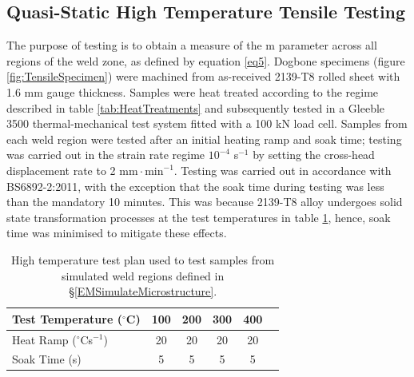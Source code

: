 	\subsection{Quasi-Static High Temperature Tensile Testing}
	\label{EMTensileHT}
	The purpose of testing is to obtain a measure of the m parameter across all regions of the weld zone, as defined by equation \ref{eq5}. Dogbone specimens (figure \ref{fig:TensileSpecimen}) were machined from as-received 2139-T8 rolled sheet with 1.6 mm gauge thickness. Samples were heat treated according to the regime described in table \ref{tab:HeatTreatments} and subsequently tested in a Gleeble 3500 thermal-mechanical test system fitted with a 100 kN load cell. Samples from each weld region were tested after an initial heating ramp and soak time; testing was carried out in the strain rate regime $10^{-4}$ s$^{-1}$ by setting the cross-head displacement rate to 2 $\text{mm}\!\cdot\!\text{min}^{-1}$. Testing was carried out in accordance with BS6892-2:2011, with the exception that the soak time during testing was less than the mandatory 10 minutes. This was because 2139-T8 alloy undergoes solid state transformation processes at the test temperatures in table \ref{tab:HighTempPlan}, hence, soak time was minimised to mitigate these effects. 
	\begin{table}[htbp]
		\centering
		\caption{High temperature test plan used to test samples from simulated weld regions defined in \S\ref{EMSimulateMicrostructure}.}
		\begin{tabularx}{\columnwidth}{X*{5}{c}} 
			\toprule
			Test Temperature ($^\circ$C) & 100   & 200   & 300   & 400 \\
			\midrule
			Heat Ramp ($^\circ$Cs$^{-1}$) & 20    & 20    & 20    & 20 \\
			Soak Time (s) & 5     & 5     & 5     & 5 \\
			\bottomrule
		\end{tabularx}%
		\label{tab:HighTempPlan}%
	\end{table}%
